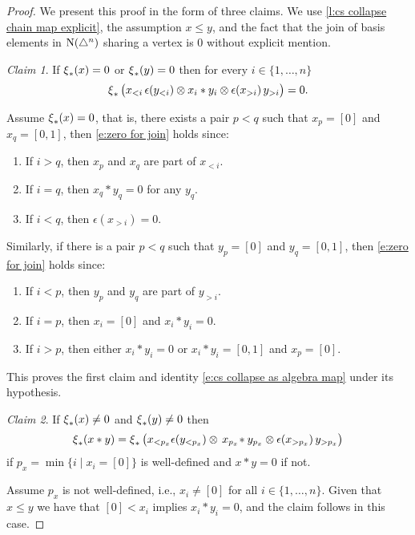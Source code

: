 \begin{proof}
	We present this proof in the form of three claims.
	We use \cref{l:cs collapse chain map explicit}, the assumption $x \leq y$, and the fact that the join of basis elements in $\operatorname{N}(\triangle^n)$ sharing a vertex is $0$ without explicit mention. \newline

	\noindent \textit{Claim 1}.
	If $\operatorname{\xi}_\ast(x) = 0$ or $\operatorname{\xi}_\ast(y) = 0$ then for every $i \in \{1, \dots, n\}$
	\begin{equation} \label{e:zero for join}
	\operatorname{\xi}_\ast \big( x_{<i}\, \epsilon(y_{<i}) \otimes x_i \ast y_i \otimes \epsilon(x_{>i}) \, y_{>i} \big) = 0.
	\end{equation}

	Assume $\operatorname{\xi}_\ast(x) = 0$, that is, there exists a pair $p < q$ such that $x_p = [0]$ and $x_q = [0,1]$, then \eqref{e:zero for join} holds since:
	\begin{enumerate}
		\item If $i > q$, then $x_p$ and $x_q$ are part of $x_{<i}$.
		\item If $i = q$, then $x_q \ast y_q = 0$ for any $y_q$.
		\item If $i < q$, then $\epsilon(x_{>i}) = 0$.
	\end{enumerate}
	Similarly, if there is a pair $p < q$ such that $y_p = [0]$ and $y_q = [0,1]$,  then \eqref{e:zero for join} holds since:
	\begin{enumerate}
		\item If $i < p$, then $y_p$ and $y_q$ are part of $y_{>i}$.
		\item If $i = p$, then $x_i = [0]$ and $x_i \ast y_i = 0$.
		\item If $i > p$, then either $x_i \ast y_i = 0$ or $x_i \ast y_i = [0,1]$ and $x_p = [0]$.
	\end{enumerate}
	This proves the first claim and identity \eqref{e:cs collapse as algebra map} under its hypothesis. \newline

	\noindent \textit{Claim 2}.
	If $\operatorname{\xi}_\ast(x) \neq 0$ and $\operatorname{\xi}_\ast(y) \neq 0$ then
	\[
	\operatorname{\xi}_\ast(x \ast y) =
	\operatorname{\xi}_\ast \big( x_{<p_x} \epsilon(y_{<p_x}) \otimes \, x_{p_x} \! \ast y_{p_x} \otimes \epsilon(x_{>p_x}) \, y_{>p_x} \big)
	\]
	if $p_x = \min \big\{ i \mid x_i = [0] \big\}$ is well-defined and $x \ast y = 0$ if not.

	Assume $p_x$ is not well-defined, i.e., $x_i \neq [0]$ for all $i \in \{1, \dots, n\}$.
	Given that $x \leq y$ we have that $[0] < x_i$ implies $x_i \ast y_i = 0$, and the claim follows in this case.


\end{proof}

